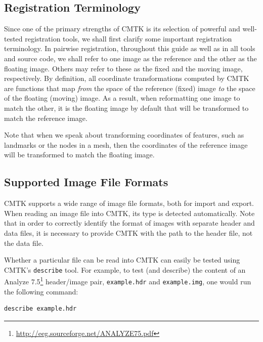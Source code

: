 \documentclass{InsightArticle}
\begin{document}
\subsection{Registration Terminology}

Since one of the primary strengths of CMTK is its selection of powerful and
well-tested registration tools, we shall first clarify some important
registration terminology.  In pairwise
registration,  throughout this guide as well as
in all tools and source code, we shall refer to one image as the reference and
the other as the floating image. Others may refer to these as the fixed and
the moving image, respectively. By definition, all coordinate transformations
computed by CMTK are functions that map {\em from\/} the space of the
reference (fixed) image {\em to\/} the space of the floating (moving)
image. As a result, when reformatting one image to match the other, it is the
floating image by default that will be transformed to match the reference
image.

Note that when we speak about transforming coordinates of features, such as
landmarks or the nodes in a mesh, then the coordinates of the reference image
will be transformed to match the floating image.

\subsection{Supported Image File Formats}

CMTK supports a wide range of image file formats, both for import and
export. When reading an image file into CMTK, its type is detected
automatically. Note that in order to correctly identify the format of images
with separate header and data files, it is necessary to provide CMTK with the
path to the header file, not the data file.

Whether a particular file can be read into CMTK can easily be tested using
CMTK's \verb|describe| tool. For example, to test (and describe) the content
of an Analyze 7.5\footnote{\url{http://eeg.sourceforge.net/ANALYZE75.pdf}}
header/image pair, \verb|example.hdr| and \verb|example.img|, one would run
the following command:
\begin{verbatim}
describe example.hdr
\end{verbatim}
\end{document}
